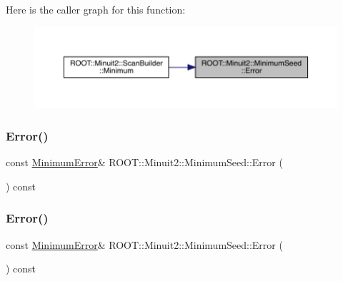 Here is the caller graph for this function\+:
\nopagebreak
\begin{figure}[H]
\begin{center}
\leavevmode
\includegraphics[width=350pt]{d1/d50/classROOT_1_1Minuit2_1_1MinimumSeed_a19cc15c1feb45267a1a8b2cdb4f25ac2_icgraph}
\end{center}
\end{figure}
\mbox{\label{classROOT_1_1Minuit2_1_1MinimumSeed_a19cc15c1feb45267a1a8b2cdb4f25ac2}} 
\subsubsection{\texorpdfstring{Error()}{Error()}\hspace{0.1cm}{\footnotesize\ttfamily [2/3]}}
{\footnotesize\ttfamily const \mbox{\hyperlink{classROOT_1_1Minuit2_1_1MinimumError}{Minimum\+Error}}\& R\+O\+O\+T\+::\+Minuit2\+::\+Minimum\+Seed\+::\+Error (\begin{DoxyParamCaption}{ }\end{DoxyParamCaption}) const\hspace{0.3cm}{\ttfamily [inline]}}

\mbox{\label{classROOT_1_1Minuit2_1_1MinimumSeed_a19cc15c1feb45267a1a8b2cdb4f25ac2}} 
\subsubsection{\texorpdfstring{Error()}{Error()}\hspace{0.1cm}{\footnotesize\ttfamily [3/3]}}
{\footnotesize\ttfamily const \mbox{\hyperlink{classROOT_1_1Minuit2_1_1MinimumError}{Minimum\+Error}}\& R\+O\+O\+T\+::\+Minuit2\+::\+Minimum\+Seed\+::\+Error (\begin{DoxyParamCaption}{ }\end{DoxyParamCaption}) const\hspace{0.3cm}{\ttfamily [inline]}}

